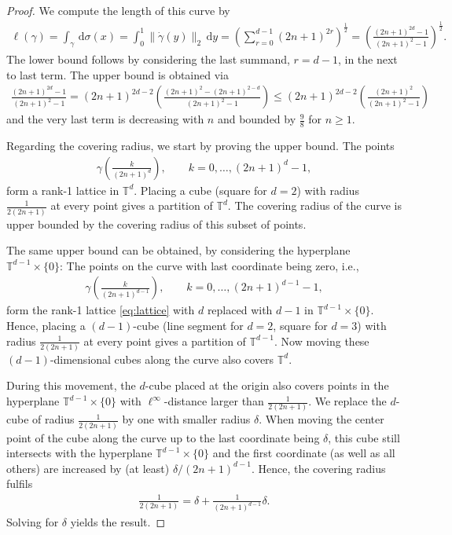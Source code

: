 \documentclass[10pt,a4paper]{amsart}
\newcommand{\T}{\ensuremath{\mathbb{T}}}
\renewcommand{\d}{\,\mathrm{d}}
\begin{document}
\begin{proof}
We compute the length of this curve by
\begin{align*}
    \ell(\gamma)
    =\int_{\gamma}\d\sigma(x)
    =\int_0^1 \|\dot\gamma(y)\|_2\d y
    =\left(\sum_{r=0}^{d-1} (2n+1)^{2r}\right)^{\frac12}
    =\left(\frac{(2n+1)^{2d}-1}{(2n+1)^2-1}\right)^{\frac12}.
\end{align*}
The lower bound follows by considering the last summand, $r=d-1$, in the next to last term.
The upper bound is obtained via
\begin{align*}
 \frac{(2n+1)^{2d}-1}{(2n+1)^2-1}
 =(2n+1)^{2d-2}\left(\frac{(2n+1)^{2}-(2n+1)^{2-d}}{(2n+1)^2-1}\right)
 \le (2n+1)^{2d-2}\left(\frac{(2n+1)^{2}}{(2n+1)^2-1}\right)
\end{align*}
and the very last term is decreasing with $n$ and bounded by $\frac{9}{8}$ for $n\ge 1$.

Regarding the covering radius, we start by proving the upper bound. The points
\begin{align}\label{eq:lattice}
 \gamma\left(\frac{k}{(2n+1)^{d}}\right),\qquad k=0,\hdots,(2n+1)^{d}-1,
\end{align}
form a rank-1 lattice in $\T^{d}$. Placing a cube (square for $d=2$) with radius $\frac{1}{2(2n+1)}$ at every point gives a partition of $\T^{d}$. The covering radius of the curve is upper bounded by the covering radius of this subset of points.

The same upper bound can be obtained, by considering the hyperplane $\T^{d-1}\times\{0\}$: The points on the curve with last coordinate being zero, i.e.,
\begin{align*}
 \gamma\left(\frac{k}{(2n+1)^{d-1}}\right),\qquad k=0,\hdots,(2n+1)^{d-1}-1,
\end{align*}
form the rank-1 lattice \eqref{eq:lattice} with $d$ replaced with $d-1$ in $\T^{d-1}\times\{0\}$.
Hence, placing a $(d-1)$-cube (line segment for $d=2$, square for $d=3$) with radius $\frac{1}{2(2n+1)}$ at every point gives a partition of $\T^{d-1}$. Now moving these $(d-1)$-dimensional cubes along the curve also covers $\T^d$.

During this movement, the $d$-cube placed at the origin also covers points in the hyperplane $\T^{d-1}\times\{0\}$ with $\ell^\infty$-distance larger than $\frac{1}{2(2n+1)}$. We replace the $d$-cube of radius $\frac{1}{2(2n+1)}$ by one with smaller radius $\delta$.
When moving the center point of the cube along the curve up to the last coordinate being $\delta$, this cube still intersects with the 
hyperplane $\T^{d-1}\times\{0\}$ and the first coordinate (as well as all others) are increased by (at least) $\delta/(2n+1)^{d-1}$. Hence, the covering radius fulfils
\begin{align*}
 \frac{1}{2(2n+1)}=\delta+\frac{1}{(2n+1)^{d-1}}\delta.
\end{align*}
Solving for $\delta$ yields the result.
\end{proof}
\end{document}
